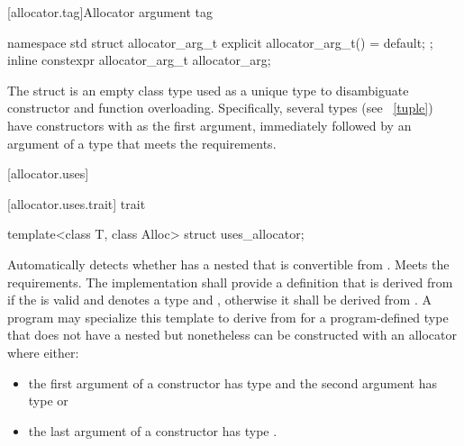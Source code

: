 [allocator.tag]{Allocator argument tag}

%
%
\begin{itemdecl}
namespace std {
  struct allocator_arg_t { explicit allocator_arg_t() = default; };
  inline constexpr allocator_arg_t allocator_arg{};
}
\end{itemdecl}

\pnum
The  struct is an empty class type used as a unique type to
disambiguate constructor and function overloading. Specifically, several types (see
~\ref{tuple}) have constructors with  as the first
argument, immediately followed by an argument of a type that meets the
 requirements.

[allocator.uses]{}

[allocator.uses.trait]{ trait}

%
\begin{itemdecl}
template<class T, class Alloc> struct uses_allocator;
\end{itemdecl}

\begin{itemdescr}
\pnum
\remarks
Automatically detects whether  has a nested  that
is convertible from . Meets the 
requirements. The implementation shall provide a definition that is
derived from  if the  
is valid and denotes a type and
, otherwise it shall be
derived from . A program may specialize this template to derive from
 for a program-defined type  that does not have a nested
 but nonetheless can be constructed with an allocator where
either:
\begin{itemize}
\item the first argument of a constructor has type  and the
second argument has type  or

\item the last argument of a constructor has type .
\end{itemize}
\end{itemdescr}

